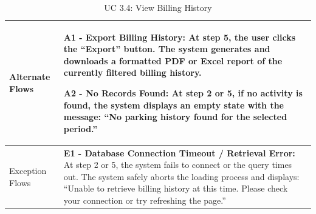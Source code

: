 \begin{table}[H]
\begin{tabularx}{\textwidth}{|>{\raggedright\arraybackslash}p{3.5cm}|>{\RaggedRight\arraybackslash}X|}
\hline
Alternate Flows & 
\textbf{A1 - Export Billing History:} At step 5, the user clicks the ``Export'' button. The system generates and downloads a formatted PDF or Excel report of the currently filtered billing history. \par \vspace{0.5em}
\textbf{A2 - No Records Found:} At step 2 or 5, if no activity is found, the system displays an empty state with the message: ``No parking history found for the selected period.'' \\
\hline
Exception Flows & 
\textbf{E1 - Database Connection Timeout / Retrieval Error:} At step 2 or 5, the system fails to connect or the query times out. The system safely aborts the loading process and displays: ``Unable to retrieve billing history at this time. Please check your connection or try refreshing the page.'' \\
\hline
\end{tabularx}
\caption{UC 3.4: View Billing History}
\label{tab:uc3.4}
\end{table}